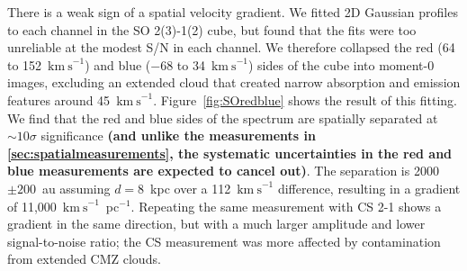 \documentclass[]{aastex631}
\newcommand{\kms}{\ensuremath{\mathrm{km~s}^{-1}}\xspace}
\def\rr#1{\textbf{#1}}
\begin{document}
There is a weak sign of a spatial velocity gradient.
We fitted 2D Gaussian profiles to each channel in the SO 2(3)-1(2) cube, but found that the fits were too unreliable at the modest S/N in each channel.
We therefore collapsed the red (64 to 152~\kms) and blue ($-68$ to 34~\kms) sides of the cube into moment-0 images, excluding an extended cloud that created narrow absorption and emission features around 45~\kms.
Figure~\ref{fig:SOredblue} shows the result of this fitting.
We find that the red and blue sides of the spectrum are spatially separated at $\sim10\sigma$ significance \rr{(and unlike the measurements in \ref{sec:spatialmeasurements}, the systematic uncertainties in the red and blue measurements are expected to cancel out)}.
The separation is 2000$\pm200$~au assuming $d=8$~kpc over a 112~\kms difference, resulting in a gradient of 11,000~\kms~pc$^{-1}$.
Repeating the same measurement with CS 2-1 shows a gradient in the same direction, but with a much larger amplitude and lower signal-to-noise ratio; the CS measurement was more affected by contamination from extended CMZ clouds.
\end{document}
